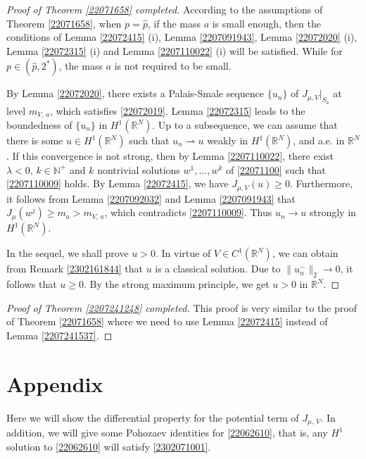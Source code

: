 \documentclass[10pt]{article}
\numberwithin{equation}{section}
\numberwithin{equation}{section}
\begin{document}
\begin{proof}[Proof of Theorem \ref{22071658} completed]
According to the assumptions of Theorem \ref{22071658}, when $p=\hat{p}$, if the mass $a$ is small enough, then the conditions of Lemma \ref{22072415} (i), Lemma \ref{2207091943}, Lemma \ref{22072020} (i), Lemma \ref{22072315} (i) and Lemma \ref{2207110022} (i) will be satisfied. While for $p\in (\hat{p}, 2^*)$, the mass $a$ is not required to be small. \par
By Lemma \ref{22072020}, there exists a Palais-Smale sequence $\{u_n\}$ of $J_{\mu, V}|_{S_a}$ at level ${m}_{V,\, a}$, which satisfies \eqref{22072019}. Lemma \ref{22072315} leads to the boundedness of $\{u_n\}$ in $H^1(\mathbb{R}^N)$. Up to a subsequence, we can assume that there is some $u\in H^1 (\mathbb{R}^N)$ such that $u_n \rightharpoonup u$ weakly in $H^1(\mathbb{R}^N)$, and a.e. in $\mathbb{R}^N$. If this convergence is not strong, then by Lemma \ref{2207110022}, there exist $\lambda<0,\, k\in \mathbb{N}^+$ and $k$ nontrivial solutions $w^1,\dots, w^k$ of \eqref{22071100} such that \eqref{2207110009} holds. By Lemma \ref{22072415}, we have $J_{\mu, V}(u)\ge 0$. Furthermore, it follows from Lemma \ref{2207092032} and Lemma \ref{2207091943} that $J_{\mu}(w^j)\ge m_a >m_{V,\, a}$, which contradicts \eqref{2207110009}. Thus $u_n\rightarrow u$ strongly in $H^1(\mathbb{R}^N)$.\par
In the sequel, we shall prove $u>0$. In virtue of $V\in C^1(\mathbb{R}^N)$,  we can obtain from Remark \ref{2302161844} that $u$ is a classical solution. Due to $\|u_n^-\|_2\to 0$, it follows that $u\ge 0$. By the strong maximum principle, we get $u>0$ in $\mathbb{R}^N$.
\end{proof}
\begin{proof}[Proof of Theorem \ref{2207241248} completed] This proof is very similar to the proof of Theorem \ref{22071658} where we need to use Lemma \ref{22072415} instead of Lemma \ref{2207241537}.
\end{proof}

\appendix\section{Appendix}
Here we will show the differential property for the potential term of $J_{\mu,\, V}$. In addition, we will give some Pohozaev identities for \eqref{22062610}, that is, any $H^1$ solution to \eqref{22062610} will satisfy \eqref{2302071001}. 
\end{document}
